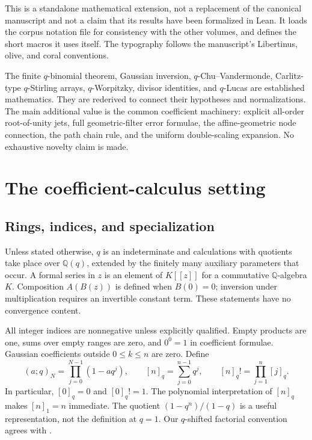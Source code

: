 \documentclass[11pt,a4paper,oneside,openany]{book}
\theoremstyle{definition}
\theoremstyle{remark}
\newcommand{\Q}{\mathbb Q}
\newcommand{\qi}[2][q]{[#2]_{#1}}
\newcommand{\qf}[2][q]{[#2]_{#1}!}
\begin{document}
This is a standalone mathematical extension, not a replacement of the
canonical manuscript and not a claim that its results have been formalized
in Lean. It loads the corpus notation file 
for consistency with the other volumes, and defines the short macros it uses
itself. The typography follows the manuscript's Libertinus, olive, and coral
conventions.

\begin{auditbox}[title={What ``an extension'' means here}]
The finite \(q\)-binomial theorem, Gaussian inversion, \(q\)-Chu--Vandermonde,
Carlitz-type \(q\)-Stirling arrays, \(q\)-Worpitzky, divisor identities, and
\(q\)-Lucas are established mathematics. They are rederived to connect their
hypotheses and normalizations. The main additional value is the common
coefficient machinery: explicit all-order root-of-unity jets, full
geometric-filter error formulae, the affine-geometric node connection, the
path chain rule, and the uniform double-scaling expansion. No exhaustive
novelty claim is made.
\end{auditbox}
\begingroup
\small
\tableofcontents
\endgroup

\mainmatter

\chapter{The coefficient-calculus setting}
\label{q1:qcc:setting}
\section{Rings, indices, and specialization}
Unless stated otherwise, \(q\) is an indeterminate and calculations with
quotients take place over \(\Q(q)\), extended by the finitely many auxiliary
parameters that occur. A formal series in \(z\) is an element of \(K[[z]]\) for a
commutative \(\Q\)-algebra \(K\). Composition \(A(B(z))\) is defined when
\(B(0)=0\); inversion under multiplication requires an invertible constant term.
These statements have no convergence content.

All integer indices are nonnegative unless explicitly qualified. Empty products
are one, sums over empty ranges are zero, and \(0^0=1\) in coefficient formulae.
Gaussian coefficients outside \(0\le k\le n\) are zero. Define
\begin{equation}\label{q1:qcc:notation}
 (a;q)_N=\prod_{j=0}^{N-1}(1-aq^j),\qquad
 \qi n=\sum_{j=0}^{n-1}q^j,\qquad
 \qf n=\prod_{j=1}^n\qi j.
\end{equation}
In particular, \([0]_q=0\) and \([0]_q!=1\). The polynomial interpretation of
\([n]_q\) makes \([n]_1=n\) immediate. The quotient
\((1-q^n)/(1-q)\) is a useful representation, not the definition at \(q=1\).
Our \(q\)-shifted factorial convention agrees with \cite{dlmf172}.
\end{document}

